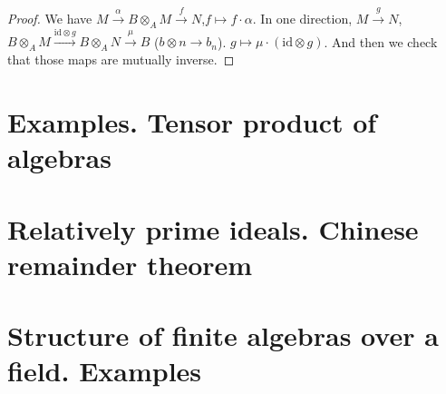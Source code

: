 \begin{proof}
We have $M\xrightarrow{\alpha} B \otimes_A M \xrightarrow{f} N$,$f\mapsto f\cdot\alpha$. In one direction, $M\xrightarrow{g} N$, $B\otimes_A M\xrightarrow{\text{id}\otimes g}B\otimes_A N\xrightarrow{\mu}B$ ($b\otimes n \to b_n$). $g\mapsto \mu\cdot(\text{id}\otimes g)$.  And then we check that those maps are mutually inverse.
\end{proof}

\section{Examples. Tensor product of algebras}
\section{Relatively prime ideals. Chinese remainder theorem}
\section{Structure of finite algebras over a field. Examples}